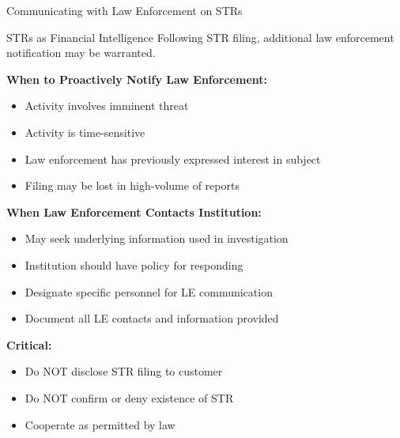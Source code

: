 \documentclass[11pt,a4paper]{beamer}
\begin{document}
	\begin{frame}{Communicating with Law Enforcement on STRs}
		\begin{block}{STRs as Financial Intelligence}
			Following STR filing, additional law enforcement notification may be warranted.
		\end{block}
		\textbf{When to Proactively Notify Law Enforcement:}
		\begin{itemize}
			\item Activity involves imminent threat
			\item Activity is time-sensitive
			\item Law enforcement has previously expressed interest in subject
			\item Filing may be lost in high-volume of reports
		\end{itemize}
		\textbf{When Law Enforcement Contacts Institution:}
		\begin{itemize}
			\item May seek underlying information used in investigation
			\item Institution should have policy for responding
			\item Designate specific personnel for LE communication
			\item Document all LE contacts and information provided
		\end{itemize}
		\textbf{Critical:}
		\begin{itemize}
			\item Do NOT disclose STR filing to customer
			\item Do NOT confirm or deny existence of STR
			\item Cooperate as permitted by law
		\end{itemize}
	\end{frame}
	
	
\end{document}
